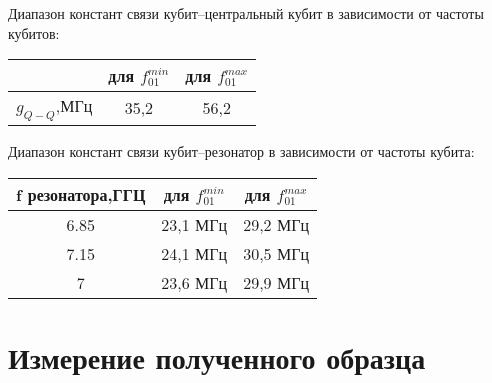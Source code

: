 \documentclass[12pt, a4paper, openany]{book}
\begin{document}
Диапазон констант связи кубит--центральный кубит в зависимости от частоты кубитов:
	\begin{center}
		\begin{tabular}{ | c | c | c |}
  	  	\hline
   		  &для $f_{01}^{min}$ &для $f_{01}^{max}$ \\ \hline
    		  $g_{Q-Q}$,МГц &35,2  & 56,2 \\ \hline
		\end{tabular}
	\end{center} 
	
Диапазон констант связи кубит--резонатор в зависимости от частоты кубита:
	\begin{center}
		\begin{tabular}{ | c | c | c |}
  	  	\hline
   		  f резонатора,ГГЦ&для $f_{01}^{min}$ &для $f_{01}^{max}$ \\ \hline
    		  6.85 &23,1 МГц & 29,2 МГц \\ \hline
    		  7.15 &24,1 МГц & 30,5 МГц \\ \hline
   	 	  7 &23,6 МГц & 29,9 МГц \\ \hline
		\end{tabular}
	\end{center} 


\section{Измерение полученного образца}
\end{document}
